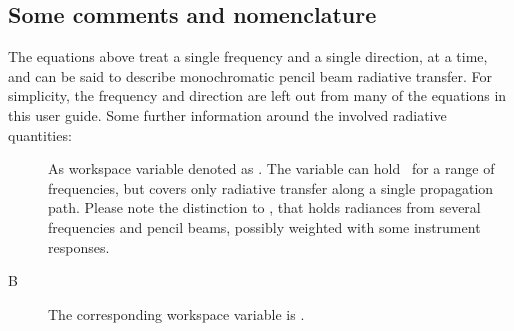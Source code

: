 \subsection{Some comments and nomenclature}
\label{sec:rteq:names}
%
The equations above treat a single frequency and a single direction, at a
time, and can be said to describe monochromatic pencil beam radiative
transfer. For simplicity, the frequency and direction are left out from many of
the equations in this user guide. 
Some further information around the involved radiative quantities:
\begin{description}
\item[\StoVec] As workspace variable denoted as . The variable can
  hold \StoVec\ for a range of frequencies, but covers only radiative transfer
  along a single propagation path. Please note the distinction to ,
  that holds radiances from several frequencies and pencil beams, possibly
  weighted with some instrument responses.
%

\item[B] The corresponding workspace variable is
  .




\end{description}
